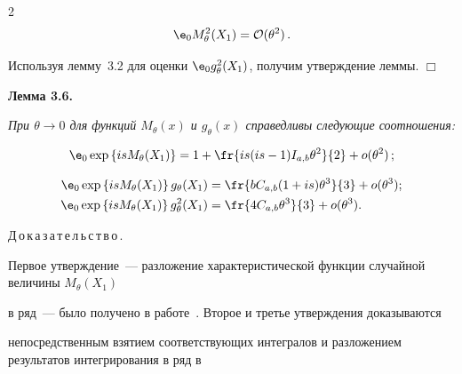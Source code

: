 \begin{multicols}{2}
$$


{\e}_0 M_{\theta}^2(X_1) = {\cal O}(\theta^2)\,.


$$


Используя лемму~3.2 для оценки ${\e}_0 g_{\theta}^2(X_1)$, получим утверждение леммы. \hfill $\Box$





\medskip








\noindent


\textbf{Лемма 3.6.}


\textit{При $\theta \to 0$ для функций $M_{\theta}(x)$ и $g_{\theta}(x)$ справедливы следующие соотношения:}


$$


{\e}_0 \exp\left\{isM_{\theta}(X_1)\right\} = 1 + \fr{is(is-1)\iab \theta^2}{2} +  o(\theta^2)\,;


$$





\noindent


\begin{align*}


\hspace*{-0.2pt}{\e}_0 \exp\left\{isM_{\theta}(X_1)\right\} g_{\theta}(X_1) &= \fr{b\cab(1+is)\theta^3}{3} +  o(\theta^3);


\\


\hspace*{-0.2pt}{\e}_0 \exp\left\{isM_{\theta}(X_1)\right\} g_{\theta}^2(X_1) &= \fr{4\cab \theta^3}{3} +  o(\theta^3).


\end{align*}





\medskip





\noindent


Д\,о\,к\,а\,з\,а\,т\,е\,л\,ь\,с\,т\,в\,о\,.\ 


Первое утверждение~--- разложение характеристической функции случайной величины $M_{\theta}(X_1)$ 


в ряд~--- было получено в работе~\cite{article}. Второе и третье утверждения доказываются 


непосредственным взятием соответствующих интегралов и разложением результатов интегрирования в ряд в 



\end{multicols}
